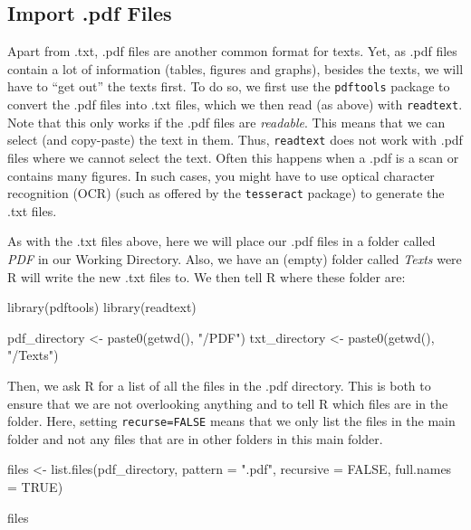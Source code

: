 \documentclass[
]{article}
\newenvironment{Shaded}{\begin{snugshade}}{\end{snugshade}}
\newcommand{\AttributeTok}[1]{\textcolor[rgb]{0.77,0.63,0.00}{#1}}
\newcommand{\ConstantTok}[1]{\textcolor[rgb]{0.00,0.00,0.00}{#1}}
\newcommand{\FunctionTok}[1]{\textcolor[rgb]{0.00,0.00,0.00}{#1}}
\newcommand{\NormalTok}[1]{#1}
\newcommand{\OtherTok}[1]{\textcolor[rgb]{0.56,0.35,0.01}{#1}}
\newcommand{\StringTok}[1]{\textcolor[rgb]{0.31,0.60,0.02}{#1}}
\begin{document}
\hypertarget{import-.pdf-files}{%
\subsection{Import .pdf Files}\label{import-.pdf-files}}

Apart from .txt, .pdf files are another common format for texts. Yet, as .pdf files contain a lot of information (tables, figures and graphs), besides the texts, we will have to ``get out'' the texts first. To do so, we first use the \texttt{pdftools} package to convert the .pdf files into .txt files, which we then read (as above) with \texttt{readtext}. Note that this only works if the .pdf files are \emph{readable}. This means that we can select (and copy-paste) the text in them. Thus, \texttt{readtext} does not work with .pdf files where we cannot select the text. Often this happens when a .pdf is a scan or contains many figures. In such cases, you might have to use optical character recognition (OCR) (such as offered by the \texttt{tesseract} package) to generate the .txt files.

As with the .txt files above, here we will place our .pdf files in a folder called \emph{PDF} in our Working Directory. Also, we have an (empty) folder called \emph{Texts} were R will write the new .txt files to. We then tell R where these folder are:

\begin{Shaded}
\begin{Highlighting}[]
\FunctionTok{library}\NormalTok{(pdftools)}
\FunctionTok{library}\NormalTok{(readtext)}

\NormalTok{pdf\_directory }\OtherTok{\textless{}{-}} \FunctionTok{paste0}\NormalTok{(}\FunctionTok{getwd}\NormalTok{(), }\StringTok{"/PDF"}\NormalTok{)}
\NormalTok{txt\_directory }\OtherTok{\textless{}{-}} \FunctionTok{paste0}\NormalTok{(}\FunctionTok{getwd}\NormalTok{(), }\StringTok{"/Texts"}\NormalTok{)}
\end{Highlighting}
\end{Shaded}

Then, we ask R for a list of all the files in the .pdf directory. This is both to ensure that we are not overlooking anything and to tell R which files are in the folder. Here, setting \texttt{recurse=FALSE} means that we only list the files in the main folder and not any files that are in other folders in this main folder.

\begin{Shaded}
\begin{Highlighting}[]
\NormalTok{files }\OtherTok{\textless{}{-}} \FunctionTok{list.files}\NormalTok{(pdf\_directory, }\AttributeTok{pattern =} \StringTok{".pdf"}\NormalTok{, }\AttributeTok{recursive =} \ConstantTok{FALSE}\NormalTok{,}
    \AttributeTok{full.names =} \ConstantTok{TRUE}\NormalTok{)}

\NormalTok{files}
\end{Highlighting}
\end{Shaded}
\end{document}
